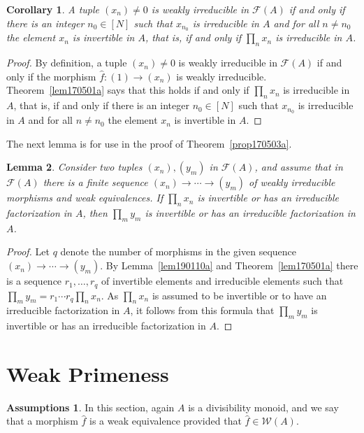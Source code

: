 \documentclass[reqno]{amsart}
\theoremstyle{plain}
\newtheorem{lem}{Lemma}[section]
\newtheorem{cor}[lem]{Corollary}
\theoremstyle{definition}
\newtheorem*{assumptions}{Assumptions}
\newcommand{\cat}[1]{\mathcal{#1}}
\newcommand{\catw}{\cat{W}}
\newcommand{\catf}{\cat{F}}
\newcommand{\emptytuple}{\mathfrak{0}}
\numberwithin{equation}{lem}
\begin{document}
\begin{cor}\label{cor170501a}
A tuple $(x_n)\neq\emptytuple$ is 
weakly
irreducible in $\catf(A)$
if and only if
there is an integer $n_0\in[N]$ such that
$x_{n_0}$ is irreducible in $A$ and for all $n\neq n_0$ the element $x_n$ is invertible in $A$,
that is, if and only if $\prod_nx_n$ is irreducible in $A$.
\end{cor}

\begin{proof}
By definition, a tuple $(x_n)\neq\emptytuple$ is 
weakly
irreducible in $\catf(A)$
if and only if the morphism $\hat f\colon (1)\to (x_n)$ is 
weakly
irreducible.
Theorem~\ref{lem170501a} says that this holds if and only if $\prod_nx_n$ is irreducible in $A$, 
that is, if and only if there is an integer $n_0\in[N]$ such that
$x_{n_0}$ is irreducible in $A$ and for all $n\neq n_0$ the element $x_n$ is invertible in $A$.
\end{proof}

The next lemma is for use in the proof of Theorem~\ref{prop170503a}.

\begin{lem}\label{lem170503a}
Consider 
two
tuples $(x_n),(y_m)$ in $\catf(A)$,
and assume that in $\catf(A)$
there is a finite sequence
$(x_n)\to\cdots\to(y_m)$ of 
weakly
irreducible morphisms and weak equivalences.
If $\prod_nx_n$ is invertible or has an irreducible factorization in $A$,
then 
$\prod_my_m$ is invertible or has an irreducible factorization in $A$.
\end{lem}

\begin{proof}
Let $q$ denote the number of morphisms in the given sequence
$(x_n)\to\cdots\to(y_m)$. 
By 
Lemma~\ref{lem190110a} and Theorem~\ref{lem170501a}
there is a sequence
$r_1,\ldots,r_q$ of invertible elements and irreducible elements such that $\prod_my_m=r_1\cdots r_q\prod_nx_n$.
As $\prod_nx_n$ is assumed to be 
invertible or to have an irreducible factorization in $A$, it follows from this formula that 
$\prod_my_m$ is invertible or has an irreducible factorization in $A$.
\end{proof}


\section{Weak
Primeness}
\label{sec170702a}


\begin{assumptions}
In this section, again  $A$ is a divisibility monoid,
and we say that a morphism $\hat f$ is a weak equivalence provided that $\hat f\in\catw(A)$.
\end{assumptions}
\end{document}
